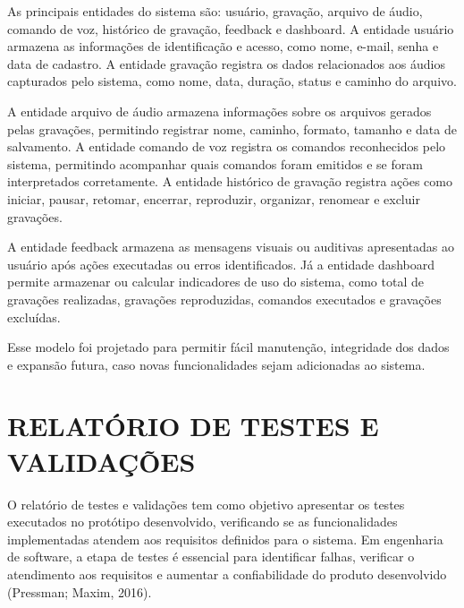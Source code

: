 \documentclass[12pt,oneside,a4paper,brazil,final]{abntex2}
\begin{document}
As principais entidades do sistema são: usuário, gravação, arquivo de áudio, comando de voz, histórico de gravação, feedback e dashboard. A entidade usuário armazena as informações de identificação e acesso, como nome, e-mail, senha e data de cadastro. A entidade gravação registra os dados relacionados aos áudios capturados pelo sistema, como nome, data, duração, status e caminho do arquivo.



A entidade arquivo de áudio armazena informações sobre os arquivos gerados pelas gravações, permitindo registrar nome, caminho, formato, tamanho e data de salvamento. A entidade comando de voz registra os comandos reconhecidos pelo sistema, permitindo acompanhar quais comandos foram emitidos e se foram interpretados corretamente. A entidade histórico de gravação registra ações como iniciar, pausar, retomar, encerrar, reproduzir, organizar, renomear e excluir gravações.



A entidade feedback armazena as mensagens visuais ou auditivas apresentadas ao usuário após ações executadas ou erros identificados. Já a entidade dashboard permite armazenar ou calcular indicadores de uso do sistema, como total de gravações realizadas, gravações reproduzidas, comandos executados e gravações excluídas.



Esse modelo foi projetado para permitir fácil manutenção, integridade dos dados e expansão futura, caso novas funcionalidades sejam adicionadas ao sistema.






\chapter{RELATÓRIO DE TESTES E VALIDAÇÕES}



O relatório de testes e validações tem como objetivo apresentar os testes executados no protótipo desenvolvido, verificando se as funcionalidades implementadas atendem aos requisitos definidos para o sistema. Em engenharia de software, a etapa de testes é essencial para identificar falhas, verificar o atendimento aos requisitos e aumentar a confiabilidade do produto desenvolvido (Pressman; Maxim, 2016).
\end{document}
